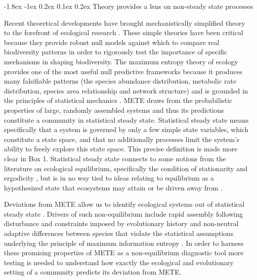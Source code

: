 \documentclass[11pt]{article}
\makeatletter
\renewcommand\subsection{\@startsection{subsection}{1}{\z@}%
                                  {-1.8ex \@plus -1ex \@minus 0.2ex}%
                                  {0.1ex \@plus 0.2ex}%
                                  {\normalfont\large\bfseries}}
\makeatother
\begin{document}
\subsection{Theory provides a lens on non-steady state processes}

Recent theoretical developments have brought mechanistically
simplified theory to the forefront of ecological research
\citep{hubbell2001, rosindell2011TREE, harte2011}.  These simple
theories have been critical because they provide robust null models
against which to compare real biodiversity patterns in order to
rigorously test the importance of specific mechanisms in shaping
biodiversity.  The maximum entropy theory of ecology
\citep[METE;][]{harte2011} provides one of the most useful null
predictive frameworks because it produces many falsifiable patterns
(the species abundance distribution, metabolic rate distribution,
species area relationship and network structure) and is grounded in
the principles of statistical mechanics \citep{harte2011, Jaynes1957}.
METE draws from the probabilistic properties of large, randomly
assembled systems \citep{harte2011} and thus its predictions
constitute a community in statistical steady state.  Statistical
steady state means specifically that a system is governed by only a
few simple state variables, which constitute a state space, and that
no additionally processes limit the system’s ability to freely explore
this state space.  This precise definition is made more clear in Box
1.  Statistical steady state connects to some notions from the
literature on ecological equilibrium, specifically the condition of
stationarity and ergodicity \citep{brian1999}, but is in no way tied
\citep{harte2011} to ideas relating to equilibrium as a hypothesized
state that ecosystems may attain or be driven away from
\citep[e.g. not:][]{levin1970, scholz1997, rabosky2009}.

Deviations from METE allow us to identify ecological systems out of
statistical steady state \citep{harte2011, rominger2015}.  Drivers of
such non-equilibrium include rapid assembly following disturbance
\citep{harte2011} and constraints imposed by evolutionary history and
non-neutral adaptive differences between species that violate the
statistical assumptions underlying the principle of maximum
information entropy \citep{rominger2015}.  In order to harness these
promising properties of METE as a non-equilibrium diagnostic tool more
testing is needed to understand how exactly the ecological and
evolutionary setting of a community predicts its deviation from METE.
\end{document}
